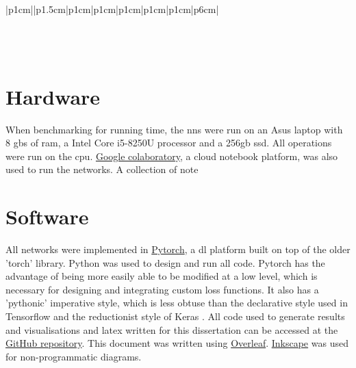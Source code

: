 \begin{landscape}
\begin{table}[hp]
\begin{tabular}{ |p{1cm}||p{1.5cm}|p{1cm}|p{1cm}|p{1cm}|p{1cm}|p{1cm}|p{6cm}| }
         \\
         \\
         \\
         \\
    \end{tabular}
    \caption{Testing Schemes run on MNIST. Coloured background indicate a change in parameters from the previous similar scheme.}
    \label{table:testing_schemes}
\end{table}

\end{landscape}


\section{Hardware}

When benchmarking for running time, the \gls{nn}s were run on an Asus laptop with 8 \gls{gb}s of \gls{ram}, a Intel Core i5-8250U processor and a 256\gls{gb} \gls{ssd}. All operations were run on the \gls{cpu}. \href{https://colab.research.google.com/}{Google colaboratory}, a cloud notebook platform, was also used to run the networks. A collection of note 

\section{Software}

All networks were implemented in \href{https://pytorch.org/}{Pytorch}, a \gls{dl} platform built on top of the older 'torch' library. Python was used to design and run all code. Pytorch has the advantage of being more easily able to be modified at a low level, which is necessary for designing and integrating custom loss functions. It also has a 'pythonic' imperative style, which is less obtuse than the declarative style used in Tensorflow and the reductionist style of Keras \cite{tale_dl}. All code used to generate results and visualisations and latex written for this dissertation can be accessed at the \href{https://github.com/MattSkiff/Flip-Probability-as-a-Loss-Function-in-Convolutional-Neural-Networks-for-Image-Classification}{GitHub repository}. This document was written using \href{https://www.overleaf.com/}{Overleaf}. \href{https://inkscape.org/}{Inkscape} was used for non-programmatic diagrams.